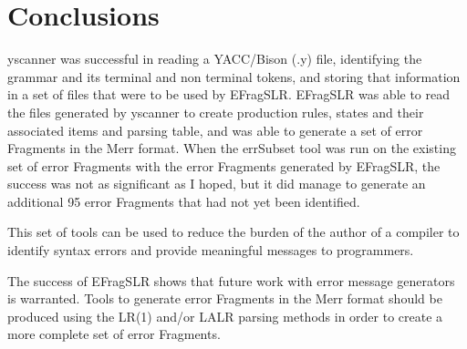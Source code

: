 \documentclass{article}
\begin{document}
\section{Conclusions}
yscanner was successful in reading a YACC/Bison (.y) file, identifying the grammar and its terminal and non terminal tokens, and storing that information in a set of files that were to be used by EFragSLR. EFragSLR was able to read the files generated by yscanner to create production rules, states and their associated items and parsing table, and was able to generate a set of error Fragments in the Merr format.  When the errSubset tool was run on the existing set of error Fragments with the error Fragments generated by EFragSLR, the success was not as significant as I hoped, but it did manage to generate an additional 95 error Fragments that had not yet been identified.

This set of tools can be used to reduce the burden of the author of a compiler to identify syntax errors and provide meaningful messages to programmers.  

The success of EFragSLR shows that future work with error message generators is warranted.  Tools to generate error Fragments in the Merr format should be produced using the LR(1) and/or LALR parsing methods in order to create a more complete set of error Fragments.
\pagebreak
{}


\end{document}
